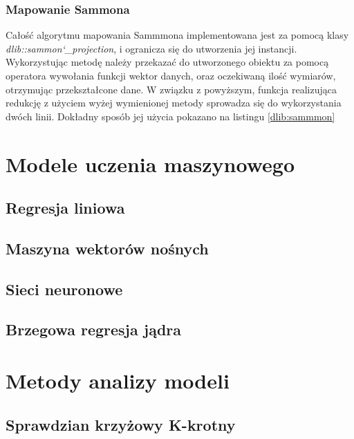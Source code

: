 
\subsubsection{Mapowanie Sammona}

Całość algorytmu mapowania Sammmona implementowana jest za pomocą klasy \textit{dlib::sammon\char`_projection}, i ogranicza się do utworzenia jej instancji. Wykorzystując metodę należy przekazać do utworzonego obiektu za pomocą operatora wywołania funkcji wektor danych, oraz oczekiwaną ilość wymiarów, otrzymując przekształcone dane. W związku z powyższym, funkcja realizująca redukcję z użyciem wyżej wymienionej metody sprowadza się do wykorzystania dwóch linii. Dokładny sposób jej użycia pokazano na listingu \ref{dlib:sammmon}


\section{Modele uczenia maszynowego}

\subsection{Regresja liniowa}
\subsection{Maszyna wektorów nośnych}
\subsection{Sieci neuronowe}
\subsection{Brzegowa regresja jądra}

\section{Metody analizy modeli}

\subsection{Sprawdzian krzyżowy K-krotny}

